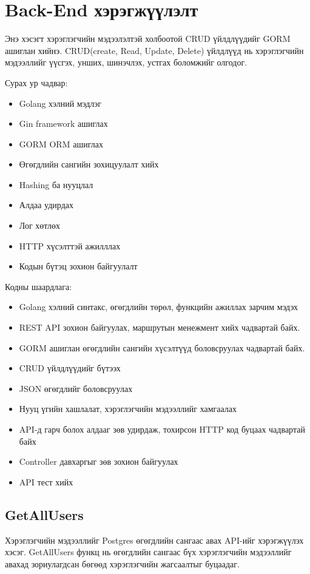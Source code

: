 \section{Back-End хэрэгжүүлэлт}
Энэ хэсэгт хэрэглэгчийн мэдээлэлтэй холбоотой CRUD үйлдлүүдийг GORM ашиглан хийнэ.
CRUD(create, Read, Update, Delete) үйлдлүүд нь хэрэглэгчийн мэдээллийг үүсгэх, унших,
шинэчлэх, устгах боломжийг олгодог.

Сурах ур чадвар:
\begin{itemize}
	\item Golang хэлний мэдлэг
	\item Gin framework ашиглах
	\item GORM ORM ашиглах
	\item Өгөгдлийн сангийн зохицуулалт хийх
	\item Hashing ба нууцлал
	\item Алдаа удирдах
	\item Лог хөтлөх
	\item HTTP хүсэлттэй ажилллах
	\item Кодын бүтэц зохион байгуулалт
\end{itemize}

Кодны шаардлага:
\begin{itemize}
	\item Golang хэлний синтакс, өгөгдлийн төрөл, функцийн ажиллах зарчим мэдэх 
	\item REST API зохион байгуулах, маршрутын менежмент хийх чадвартай байх.
	\item GORM ашиглан өгөгдлийн сангийн хүсэлтүүд боловсруулах чадвартай байх.
	\item CRUD үйлдлүүдийг бүтээх
	\item JSON өгөгдлийг боловсруулах
	\item Нууц үгийн хашлалат, хэрэглэгчийн мэдээллийг хамгаалах
	\item API-д гарч болох алдааг зөв удирдаж, тохирсон HTTP код буцаах чадвартай байх
	\item Controller  давхаргыг зөв зохион байгуулах
	\item API тест хийх
\end{itemize}
\pagebreak

\subsection{GetAllUsers}
Хэрэглэгчийн мэдээллийг Postgres өгөгдлийн сангаас авах API-ийг хэрэгжүүлэх хэсэг. GetAllUsers функц нь өгөгдлийн сангаас бүх хэрэглэгчийн мэдээллийг авахад зориулагдсан бөгөөд хэрэглэгчийн жагсаалтыг буцаадаг.

